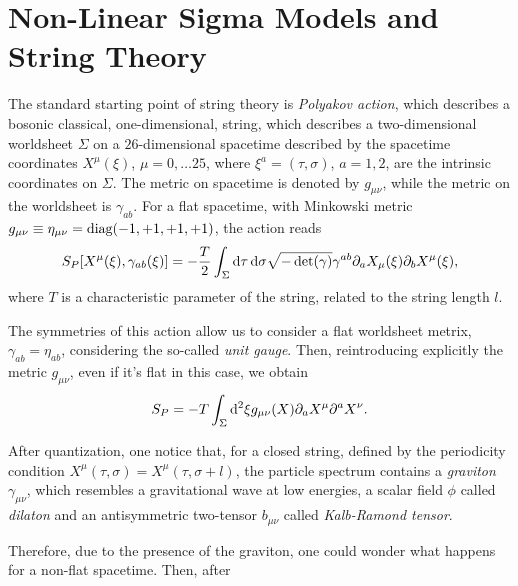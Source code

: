 \section{Non-Linear Sigma Models and String Theory}
The standard starting point of string theory is \emph{Polyakov action}, which describes a bosonic classical, one-dimensional, string, which describes a two-dimensional worldsheet $\Sigma$ on a $26$-dimensional spacetime described by the spacetime coordinates $X^\mu(\xi)$, $\mu = 0, \dots 25$, where $\xi^a = (\tau, \sigma)$, $a = 1,2$, are the intrinsic coordinates on $\Sigma$. The metric on spacetime is denoted by $g_{\mu\nu}$, while the metric on the worldsheet is $\gamma_{ab}$. For a flat spacetime, with Minkowski metric $g_{\mu\nu} \equiv \eta_{\mu\nu} = \textup{diag}(-1,+1,+1,+1)$, the action reads
\begin{equation}
    S_P [X^\mu(\xi), \gamma_{ab}(\xi)] = -\frac{T}{2} \int_\Sigma \mathop{}\!\mathrm{d} \tau \mathop{}\!\mathrm{d} \sigma \sqrt{-\det(\gamma)} \gamma^{ab} \partial_a X_\mu (\xi) \partial_b X^\mu (\xi),
\end{equation}
where $T$ is a characteristic parameter of the string, related to the string length $l$.

The symmetries of this action allow us to consider a flat worldsheet metrix, $\gamma_{ab} = \eta_{ab}$, considering the so-called \emph{unit gauge}. Then, reintroducing explicitly the metric $g_{\mu\nu}$, even if it's flat in this case, we obtain
\begin{equation}
    S_P = - T \int_\Sigma \mathop{}\!\mathrm{d}^2 \xi g_{\mu\nu}(X) \partial_a X^\mu \partial^a X^\nu.
\end{equation}

After quantization, one notice that, for a closed string, defined by the periodicity condition $X^\mu(\tau,\sigma) = X^\mu (\tau, \sigma + l)$, the particle spectrum contains a \emph{graviton} $\gamma_{\mu\nu}$, which resembles a gravitational wave at low energies, a scalar field $\phi$ called \emph{dilaton} and an antisymmetric two-tensor $b_{\mu\nu}$ called \emph{Kalb-Ramond tensor}.

Therefore, due to the presence of the graviton, one could wonder what happens for a non-flat spacetime. Then, after 